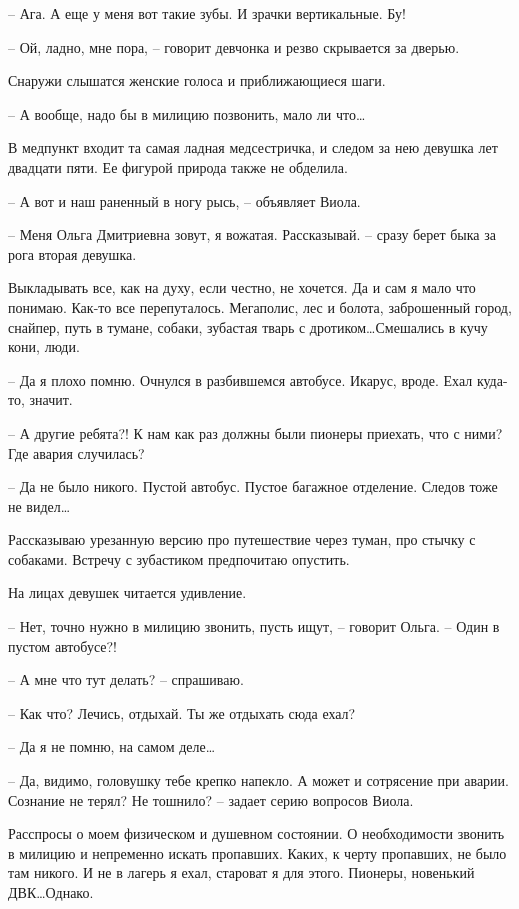 \documentclass[a4paper]{book}
\begin{document}
-- Ага. А еще у меня вот такие зубы. И зрачки вертикальные. Бу! 

-- Ой, ладно, мне пора, -- говорит девчонка и резво скрывается за дверью.

Снаружи слышатся женские голоса и приближающиеся шаги.

-- А вообще, надо бы в милицию позвонить, мало ли что\ldots 

В медпункт входит та самая ладная медсестричка, и следом за нею девушка лет двадцати пяти. Ее фигурой природа также не обделила.

-- А вот и наш раненный в ногу рысь, -- объявляет Виола. 

-- Меня Ольга Дмитриевна зовут, я вожатая. Рассказывай. -- сразу берет быка за рога вторая девушка.

Выкладывать все, как на духу, если честно, не хочется. Да и сам я мало что понимаю. Как-то все перепуталось. Мегаполис, лес и болота, заброшенный город, снайпер, путь в тумане, собаки, зубастая тварь с дротиком\ldots Смешались в кучу кони, люди.

-- Да я плохо помню. Очнулся в разбившемся автобусе. Икарус, вроде. Ехал куда-то, значит.

-- А другие ребята?! К нам как раз должны были пионеры приехать, что с ними? Где авария случилась?

-- Да не было никого. Пустой автобус. Пустое багажное отделение. Следов тоже не видел\ldots 

Рассказываю урезанную версию про путешествие через туман, про стычку с собаками. Встречу с зубастиком предпочитаю опустить. 

На лицах девушек читается удивление. 

-- Нет, точно нужно в милицию звонить, пусть ищут, -- говорит Ольга. -- Один в пустом автобусе?!

-- А мне что тут делать? -- спрашиваю.

-- Как что? Лечись, отдыхай. Ты же отдыхать сюда ехал? 

-- Да я не помню, на самом деле\ldots 

-- Да, видимо, головушку тебе крепко напекло. А может и сотрясение при аварии. Сознание не терял? Не тошнило? -- задает серию вопросов Виола.

Расспросы о моем физическом и душевном состоянии. О необходимости звонить в милицию и непременно искать пропавших. Каких, к черту пропавших, не было там никого. И не в лагерь я ехал, староват я для этого. Пионеры, новенький ДВК\ldots Однако.
\end{document}
